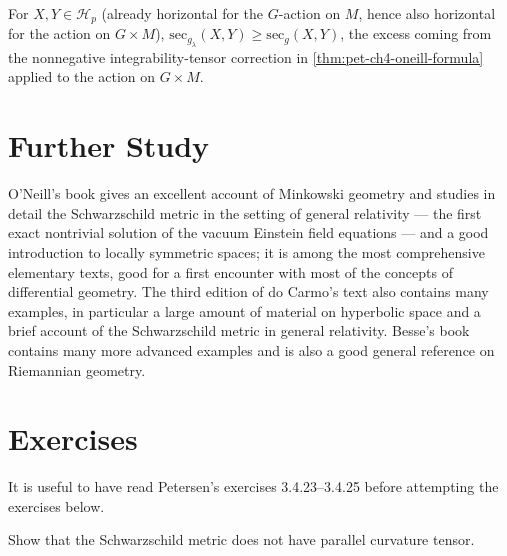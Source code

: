 \begin{remark}
  \label{rem:pet-ch4-berger-cheeger-curvature-increase}
  For $X,Y\in\mathcal H_p$ (already horizontal for the $G$-action on $M$, hence
  also horizontal for the action on $G\times M$),
  $\mathrm{sec}_{g_\lambda}(X,Y)\ge\mathrm{sec}_g(X,Y)$, the excess coming from
  the nonnegative integrability-tensor correction in
  \cref{thm:pet-ch4-oneill-formula} applied to the action on $G\times M$.
\end{remark}

\section{Further Study}

\begin{remark}
  \label{rem:pet-ch4-further-study}
  O'Neill's book gives an excellent account of Minkowski geometry and studies
  in detail the Schwarzschild metric in the setting of general relativity — the
  first exact nontrivial solution of the vacuum Einstein field equations — and
  a good introduction to locally symmetric spaces; it is among the most
  comprehensive elementary texts, good for a first encounter with most of the
  concepts of differential geometry. The third edition of do Carmo's text also
  contains many examples, in particular a large amount of material on
  hyperbolic space and a brief account of the Schwarzschild metric in general
  relativity. Besse's book contains many more advanced examples and is also a
  good general reference on Riemannian geometry.
\end{remark}

\section{Exercises}

It is useful to have read Petersen's exercises 3.4.23--3.4.25 before attempting
the exercises below.

\begin{remark}
  \label{rem:pet-ch4-ex-1}
  Show that the Schwarzschild metric does not have parallel curvature tensor.
\end{remark}

